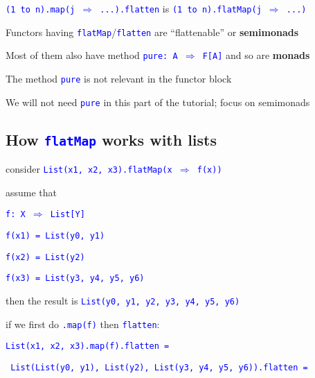 \texttt{\textcolor{blue}{\footnotesize{}(1 to n).map(j $\Rightarrow$
...).flatten}} is \texttt{\textcolor{blue}{\footnotesize{}(1 to n).flatMap(j
$\Rightarrow$ ...)}} 

Functors having \texttt{\textcolor{blue}{\footnotesize{}flatMap}}/\texttt{\textcolor{blue}{\footnotesize{}flatten}}
are ``flattenable'' or \textbf{semimonads}

Most of them also have method \texttt{\textcolor{blue}{\footnotesize{}pure:\ A
$\Rightarrow$ F{[}A{]}}} and so are \textbf{monads}

The method \texttt{\textcolor{blue}{\footnotesize{}pure}} is not relevant
in the functor block

We will not need \texttt{\textcolor{blue}{\footnotesize{}pure}} in
this part of the tutorial; focus on semimonads


\subsection{How \texttt{\textcolor{blue}{\footnotesize{}flatMap}} works with
lists}

consider \texttt{\textcolor{blue}{\footnotesize{}List(x1, x2, x3).flatMap(x
$\Rightarrow$ f(x))}} 

assume that 

\texttt{\textcolor{blue}{\footnotesize{}f: X $\Rightarrow$ List{[}Y{]}}}{\footnotesize\par}

\texttt{\textcolor{blue}{\footnotesize{}f(x1) = List(y0, y1)}}{\footnotesize\par}

\texttt{\textcolor{blue}{\footnotesize{}f(x2) = List(y2)}}{\footnotesize\par}

\texttt{\textcolor{blue}{\footnotesize{}f(x3) = List(y3, y4, y5, y6)}}{\footnotesize\par}

then the result is \texttt{\textcolor{blue}{\footnotesize{}List(y0,
y1, y2, y3, y4, y5, y6)}} 

if we first do \texttt{\textcolor{blue}{\footnotesize{}.map(f)}} then
\texttt{\textcolor{blue}{\footnotesize{}flatten}}:

\texttt{\textcolor{blue}{\footnotesize{}List(x1, x2, x3).map(f).flatten
=}}{\footnotesize\par}

\texttt{\textcolor{blue}{\footnotesize{}  List(List(y0, y1), List(y2),
List(y3, y4, y5, y6)).flatten =}}{\footnotesize\par}

